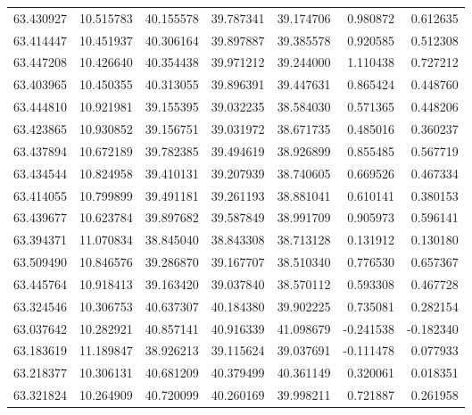 \begin{tabular}{rrrrrrr}
 63.430927 &  10.515783 &         40.155578 &         39.787341 &         39.174706 &  0.980872 &  0.612635 \\
 63.414447 &  10.451937 &         40.306164 &         39.897887 &         39.385578 &  0.920585 &  0.512308 \\
 63.447208 &  10.426640 &         40.354438 &         39.971212 &         39.244000 &  1.110438 &  0.727212 \\
 63.403965 &  10.450355 &         40.313055 &         39.896391 &         39.447631 &  0.865424 &  0.448760 \\
 63.444810 &  10.921981 &         39.155395 &         39.032235 &         38.584030 &  0.571365 &  0.448206 \\
 63.423865 &  10.930852 &         39.156751 &         39.031972 &         38.671735 &  0.485016 &  0.360237 \\
 63.437894 &  10.672189 &         39.782385 &         39.494619 &         38.926899 &  0.855485 &  0.567719 \\
 63.434544 &  10.824958 &         39.410131 &         39.207939 &         38.740605 &  0.669526 &  0.467334 \\
 63.414055 &  10.799899 &         39.491181 &         39.261193 &         38.881041 &  0.610141 &  0.380153 \\
 63.439677 &  10.623784 &         39.897682 &         39.587849 &         38.991709 &  0.905973 &  0.596141 \\
 63.394371 &  11.070834 &         38.845040 &         38.843308 &         38.713128 &  0.131912 &  0.130180 \\
 63.509490 &  10.846576 &         39.286870 &         39.167707 &         38.510340 &  0.776530 &  0.657367 \\
 63.445764 &  10.918413 &         39.163420 &         39.037840 &         38.570112 &  0.593308 &  0.467728 \\
 63.324546 &  10.306753 &         40.637307 &         40.184380 &         39.902225 &  0.735081 &  0.282154 \\
 63.037642 &  10.282921 &         40.857141 &         40.916339 &         41.098679 & -0.241538 & -0.182340 \\
 63.183619 &  11.189847 &         38.926213 &         39.115624 &         39.037691 & -0.111478 &  0.077933 \\
 63.218377 &  10.306131 &         40.681209 &         40.379499 &         40.361149 &  0.320061 &  0.018351 \\
 63.321824 &  10.264909 &         40.720099 &         40.260169 &         39.998211 &  0.721887 &  0.261958 \\

\end{tabular}

